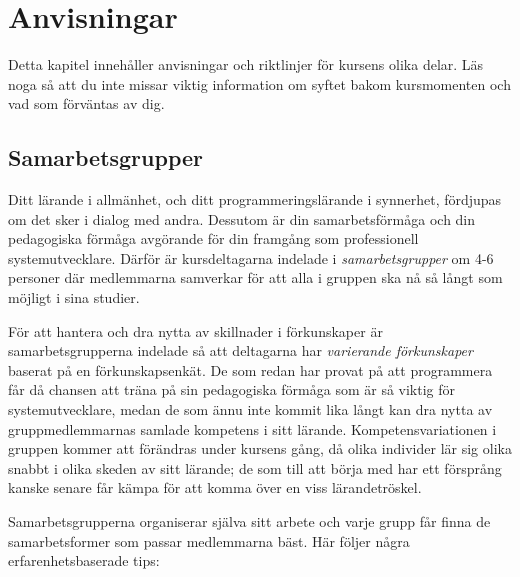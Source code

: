 

\chapter{Anvisningar}

Detta kapitel innehåller anvisningar och riktlinjer för kursens olika delar. Läs noga så att du inte missar viktig information om syftet bakom kursmomenten och vad som förväntas av dig.

\section{Samarbetsgrupper}

Ditt lärande i allmänhet, och ditt programmeringslärande i synnerhet, fördjupas om det sker i dialog med andra. Dessutom är din samarbetsförmåga och din pedagogiska förmåga avgörande för din framgång som professionell systemutvecklare. Därför är kursdeltagarna indelade i \emph{samarbetsgrupper} om 4-6 personer där medlemmarna samverkar för att alla i gruppen ska nå så långt som möjligt i sina studier.

För att hantera och dra nytta av skillnader i förkunskaper är samarbetsgrupperna indelade så att deltagarna har \emph{varierande förkunskaper} baserat på en förkunskapsenkät. De som redan har provat på att programmera får då chansen att träna på sin pedagogiska förmåga som är så viktig för systemutvecklare, medan de som ännu inte kommit lika långt kan dra nytta av gruppmedlemmarnas samlade kompetens i sitt lärande. Kompetensvariationen i gruppen kommer att förändras under kursens gång, då olika individer lär sig olika snabbt i olika skeden av sitt lärande; de som till att börja med har ett försprång kanske senare får kämpa för att komma över en viss lärandetröskel.

Samarbetsgrupperna organiserar själva sitt arbete och varje grupp får finna de samarbetsformer som passar medlemmarna bäst. Här följer några erfarenhetsbaserade tips:

